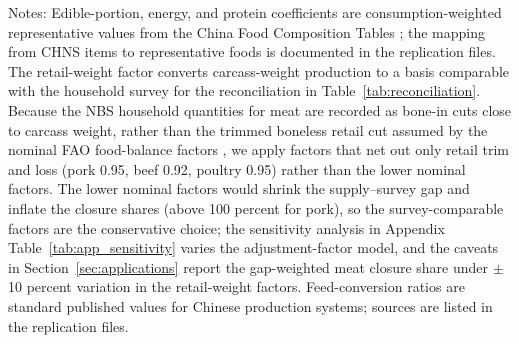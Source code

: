 \documentclass[preprint,12pt,authoryear]{elsarticle}
\begin{document}
\begin{table}[htbp]
\begin{threeparttable}
\begin{tablenotes}[flushleft]
\item Notes: Edible-portion, energy, and protein coefficients are consumption-weighted representative values from the China Food Composition Tables \citep{CFCT2019}; the mapping from CHNS items to representative foods is documented in the replication files. The retail-weight factor converts carcass-weight production to a basis comparable with the household survey for the reconciliation in Table~\ref{tab:reconciliation}. Because the NBS household quantities for meat are recorded as bone-in cuts close to carcass weight, rather than the trimmed boneless retail cut assumed by the nominal FAO food-balance factors \citep{FAO2001FBS}, we apply factors that net out only retail trim and loss (pork 0.95, beef 0.92, poultry 0.95) rather than the lower nominal factors. The lower nominal factors would shrink the supply--survey gap and inflate the closure shares (above 100 percent for pork), so the survey-comparable factors are the conservative choice; the sensitivity analysis in Appendix Table~\ref{tab:app_sensitivity} varies the adjustment-factor model, and the caveats in Section~\ref{sec:applications} report the gap-weighted meat closure share under $\pm$10 percent variation in the retail-weight factors. Feed-conversion ratios are standard published values for Chinese production systems; sources are listed in the replication files.
\end{tablenotes}
\end{threeparttable}
\end{table}
\end{document}
